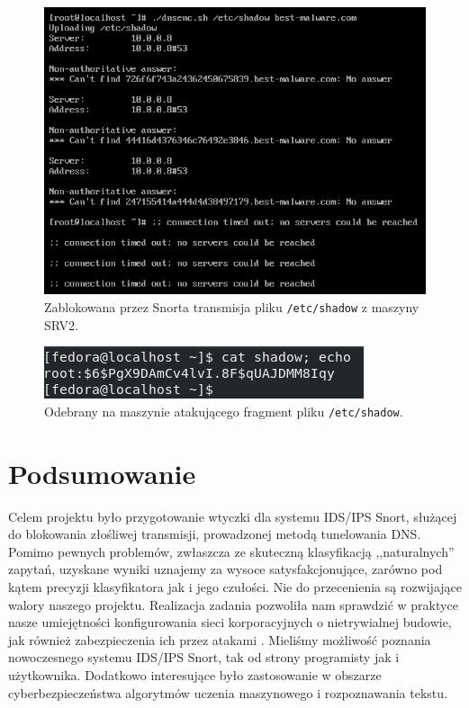 \documentclass{eiti-raport}
\begin{document}
\begin{figure}[!h] \centering
	\includegraphics[width=0.95\linewidth]{img/dnsenc.PNG}
	\caption{Zablokowana przez Snorta transmisja pliku \texttt{/etc/shadow} z maszyny SRV2.} \label{fig:dnsenc}
\end{figure}

\begin{figure}[!h] \centering
	\includegraphics[width=0.65\linewidth]{img/dnsdec.PNG}
	\caption{Odebrany na maszynie atakującego fragment pliku \texttt{/etc/shadow}.} \label{fig:dnsdec}
\end{figure}

\section{Podsumowanie} \label{sec:summary}
Celem projektu było przygotowanie wtyczki dla systemu IDS/IPS Snort, służącej do blokowania złośliwej transmisji, prowadzonej metodą tunelowania DNS. Pomimo pewnych problemów, zwłaszcza ze skuteczną klasyfikacją ,,naturalnych'' zapytań, uzyskane wyniki uznajemy za wysoce satysfakcjonujące, zarówno pod kątem precyzji klasyfikatora jak i jego czułości. Nie do przecenienia są rozwijające walory naszego projektu. Realizacja zadania pozwoliła nam sprawdzić w praktyce nasze umiejętności konfigurowania sieci korporacyjnych o nietrywialnej budowie, jak również zabezpieczenia ich przez atakami . Mieliśmy możliwość poznania nowoczesnego systemu IDS/IPS Snort, tak od strony programisty jak i użytkownika. Dodatkowo interesujące było zastosowanie w obszarze cyberbezpieczeństwa algorytmów uczenia maszynowego i rozpoznawania tekstu. 

\printbibliography
\end{document}
